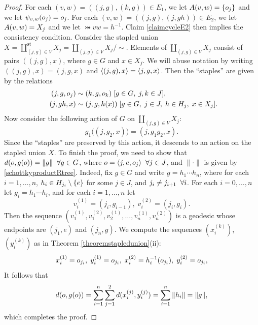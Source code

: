 \begin{proof}
For each $(v,w) = ((j,g),(k,g))\in E_1$, we let $A(v,w) = \{o_j\}$ and we let $\psi_{v,w}(o_j) = o_j$. For each $(v,w) = ((j,g),(j,gh))\in E_2$, we let $A(v,w) = X_j$ and we let $\bij vw = h^{-1}$. Claim \ref{claimcycleE2} then implies the consistency condition. Consider the stapled union $X = \coprod_{(j,g)\in V}^{\text{st}} X_j = \coprod_{(j,g)\in V} X_j / \sim$. Elements of $\coprod_{(j,g)\in V} X_j$ consist of pairs $((j,g),x)$, where $g\in G$ and $x\in X_j$. We will abuse notation by writing $((j,g),x) = (j,g,x)$ and $\langle (j,g),x\rangle = \langle j,g,x\rangle$. Then the ``staples'' are given by the relations
\begin{align*}
(j,g,o_j) &\sim  (k,g,o_k) \; [g\in G, \; j,k\in J],\\
\;\; (j,gh,x) & \sim (j,g,h(x)) \; [g\in G, \; j\in J, \; h\in H_j, \; x\in X_j].
\end{align*}
Now consider the following action of $G$ on $\coprod_{(j,g)\in V} X_j$:
\[
g_1\big((j,g_2,x)\big) = (j,g_1g_2,x).
\]
Since the ``staples'' are preserved by this action, it descends to an action on the stapled union $X$. To finish the proof, we need to show that $d(o,g(o)) = \|g\|\;\;\forall g\in G$, where $o = \langle j,e,o_j\rangle \;\;\forall j\in J$, and $\|\cdot\|$ is given by \eqref{schottkyproductRtree}. Indeed, fix $g\in G$ and write $g = h_1 \cdots h_n$, where for each $i = 1,\ldots,n$, $h_i\in H_{j_i}\setminus\{e\}$ for some $j\in J$, and $j_i\neq j_{i + 1}\;\;\forall i$. For each $i = 0,\ldots,n$ let $g_i = h_1 \cdots h_i$, and for each $i = 1,\ldots,n$ let
\[
v_i^{(1)} = (j_i,g_{i - 1}), \; v_i^{(2)} = (j_i,g_i).
\]
Then the sequence $(v_1^{(1)},v_1^{(2)},v_2^{(1)},\ldots,v_n^{(1)},v_n^{(2)})$ is a geodesic whose endpoints are $(j_1,e)$ and $(j_n,g)$. We compute the sequences $(x_i^{(k)})$, $(y_i^{(k)})$ as in Theorem \ref{theoremstapledunion}(ii):
\[
x_i^{(1)} = o_{j_i}, \; y_i^{(1)} = o_{j_i}, \; x_i^{(2)} = h_i^{-1}(o_{j_i}), \; y_i^{(2)} = o_{j_i},
\]
It follows that
\[
d(o,g(o)) = \sum_{i = 1}^n \sum_{j = 1}^2 d(x_i^{(j)},y_i^{(j)}) = \sum_{i = 1}^n \|h_i\| = \|g\|,
\]
which completes the proof.
\end{proof}

